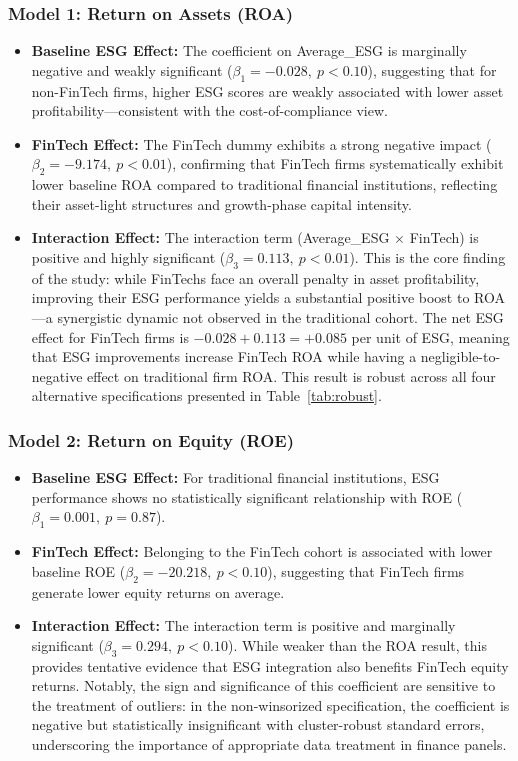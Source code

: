 \documentclass[12pt]{article}
\begin{document}
\subsubsection{Model 1: Return on Assets (ROA)}
\begin{itemize}
    \item \textbf{Baseline ESG Effect:} The coefficient on Average\_ESG is marginally negative and weakly significant ($\beta_1 = -0.028,\ p < 0.10$), suggesting that for non-FinTech firms, higher ESG scores are weakly associated with lower asset profitability---consistent with the cost-of-compliance view.
    \item \textbf{FinTech Effect:} The FinTech dummy exhibits a strong negative impact ($\beta_2 = -9.174,\ p < 0.01$), confirming that FinTech firms systematically exhibit lower baseline ROA compared to traditional financial institutions, reflecting their asset-light structures and growth-phase capital intensity.
    \item \textbf{Interaction Effect:} The interaction term (Average\_ESG $\times$ FinTech) is positive and highly significant ($\beta_3 = 0.113,\ p < 0.01$). This is the core finding of the study: while FinTechs face an overall penalty in asset profitability, improving their ESG performance yields a substantial positive boost to ROA---a synergistic dynamic not observed in the traditional cohort. The net ESG effect for FinTech firms is $-0.028 + 0.113 = +0.085$ per unit of ESG, meaning that ESG improvements increase FinTech ROA while having a negligible-to-negative effect on traditional firm ROA. This result is robust across all four alternative specifications presented in Table~\ref{tab:robust}.
\end{itemize}

\subsubsection{Model 2: Return on Equity (ROE)}
\begin{itemize}
    \item \textbf{Baseline ESG Effect:} For traditional financial institutions, ESG performance shows no statistically significant relationship with ROE ($\beta_1 = 0.001,\ p = 0.87$).
    \item \textbf{FinTech Effect:} Belonging to the FinTech cohort is associated with lower baseline ROE ($\beta_2 = -20.218,\ p < 0.10$), suggesting that FinTech firms generate lower equity returns on average.
    \item \textbf{Interaction Effect:} The interaction term is positive and marginally significant ($\beta_3 = 0.294,\ p < 0.10$). While weaker than the ROA result, this provides tentative evidence that ESG integration also benefits FinTech equity returns. Notably, the sign and significance of this coefficient are sensitive to the treatment of outliers: in the non-winsorized specification, the coefficient is negative but statistically insignificant with cluster-robust standard errors, underscoring the importance of appropriate data treatment in finance panels.
\end{itemize}
\end{document}
